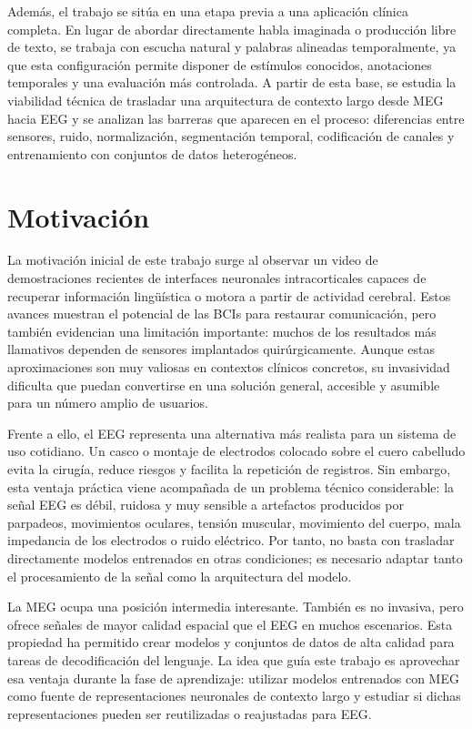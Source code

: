 Además, el trabajo se sitúa en una etapa previa a una aplicación clínica completa. En lugar de abordar directamente habla imaginada o producción libre de texto, se trabaja con escucha natural y palabras alineadas temporalmente, ya que esta configuración permite disponer de estímulos conocidos, anotaciones temporales y una evaluación más controlada. A partir de esta base, se estudia la viabilidad técnica de trasladar una arquitectura de contexto largo desde MEG hacia EEG y se analizan las barreras que aparecen en el proceso: diferencias entre sensores, ruido, normalización, segmentación temporal, codificación de canales y entrenamiento con conjuntos de datos heterogéneos.

\section{Motivación}

La motivación inicial de este trabajo surge al observar un video de demostraciones recientes de interfaces neuronales intracorticales capaces de recuperar información lingüística o motora a partir de actividad cerebral. Estos avances muestran el potencial de las BCIs para restaurar comunicación, pero también evidencian una limitación importante: muchos de los resultados más llamativos dependen de sensores implantados quirúrgicamente. Aunque estas aproximaciones son muy valiosas en contextos clínicos concretos, su invasividad dificulta que puedan convertirse en una solución general, accesible y asumible para un número amplio de usuarios.

Frente a ello, el EEG representa una alternativa más realista para un sistema de uso cotidiano. Un casco o montaje de electrodos colocado sobre el cuero cabelludo evita la cirugía, reduce riesgos y facilita la repetición de registros. Sin embargo, esta ventaja práctica viene acompañada de un problema técnico considerable: la señal EEG es débil, ruidosa y muy sensible a artefactos producidos por parpadeos, movimientos oculares, tensión muscular, movimiento del cuerpo, mala impedancia de los electrodos o ruido eléctrico. Por tanto, no basta con trasladar directamente modelos entrenados en otras condiciones; es necesario adaptar tanto el procesamiento de la señal como la arquitectura del modelo.

La MEG ocupa una posición intermedia interesante. También es no invasiva, pero ofrece señales de mayor calidad espacial que el EEG en muchos escenarios. Esta propiedad ha permitido crear modelos y conjuntos de datos de alta calidad para tareas de decodificación del lenguaje. La idea que guía este trabajo es aprovechar esa ventaja durante la fase de aprendizaje: utilizar modelos entrenados con MEG como fuente de representaciones neuronales de contexto largo y estudiar si dichas representaciones pueden ser reutilizadas o reajustadas para EEG.

